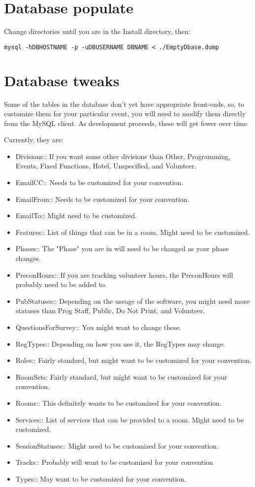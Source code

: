 \documentclass[captions=tablesignature]{scrartcl}
\begin{document}
\section{Database populate}
\label{sec-5}
Change directories until you are in the Install directory, then:
\begin{verbatim}
mysql -hDBHOSTNAME -p -uDBUSERNAME DBNAME < ./EmptyDbase.dump
\end{verbatim}

\section{Database tweaks}
\label{sec-6}
Some of the tables in the database don't yet have appropriate
front-ends, so, to customize them for your particular event, you
will need to modify them directly from the MySQL client.  As
development proceeds, these will get fewer over time.

Currently, they are:
\begin{itemize}
\item Divisions:: If you want some other divisions than Other,
Programming, Events, Fixed Functions, Hotel, Unspecified, and
Volunteer.
\item EmailCC:: Needs to be customized for your convention.
\item EmailFrom:: Needs to be customized for your convention.
\item EmailTo:: Might need to be customized.
\item Features:: List of things that can be in a room.  Might need to be
customized.
\item Phases:: The "Phase" you are in will need to be changed as your
phase changes.
\item PreconHours:: If you are tracking volunteer hours, the PreconHours
will probably need to be added to.
\item PubStatuses:: Depending on the useage of the software, you might
need more statuses than Prog Staff, Public, Do Not Print, and
Volunteer.
\item QuestionsForSurvey:: You might want to change these.
\item RegTypes:: Depending on how you use it, the RegTypes may change.
\item Roles:: Fairly standard, but might want to be customized for your
convention.
\item RoomSets: Fairly standard, but might want to be customized for
your convention.
\item Rooms:: This definitely wants to be customized for your
convention.
\item Services:: List of services that can be provided to a room.  Might
need to be customized.
\item SessionStatuses:: Might need to be customized for your
convention.
\item Tracks:: Probably will want to be customized for your convention
\item Types:: May want to be customized for your convention.
\end{itemize}
\end{document}
